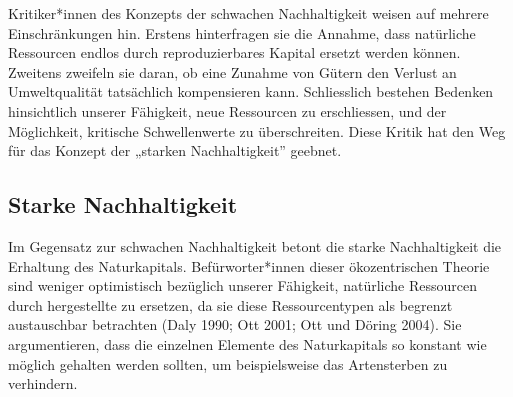 \documentclass[
  nswissgerman,
  a4paper,
  openany]{book}
\begin{document}
Kritiker*innen des Konzepts der schwachen Nachhaltigkeit weisen auf
mehrere Einschränkungen hin. Erstens hinterfragen sie die Annahme, dass
natürliche Ressourcen endlos durch reproduzierbares Kapital ersetzt
werden können. Zweitens zweifeln sie daran, ob eine Zunahme von Gütern
den Verlust an Umweltqualität tatsächlich kompensieren kann.
Schliesslich bestehen Bedenken hinsichtlich unserer Fähigkeit, neue
Ressourcen zu erschliessen, und der Möglichkeit, kritische
Schwellenwerte zu überschreiten. Diese Kritik hat den Weg für das
Konzept der „starken Nachhaltigkeit'' geebnet.

\subsection{Starke Nachhaltigkeit}\label{starke-nachhaltigkeit}

Im Gegensatz zur schwachen Nachhaltigkeit betont die starke
Nachhaltigkeit die Erhaltung des Naturkapitals. Befürworter*innen dieser
ökozentrischen Theorie sind weniger optimistisch bezüglich unserer
Fähigkeit, natürliche Ressourcen durch hergestellte zu ersetzen, da sie
diese Ressourcentypen als begrenzt austauschbar betrachten (Daly 1990;
Ott 2001; Ott und Döring 2004). Sie argumentieren, dass die einzelnen
Elemente des Naturkapitals so konstant wie möglich gehalten werden
sollten, um beispielsweise das Artensterben zu verhindern.

\begingroup\fontsize{8}{10}\selectfont
\end{document}
